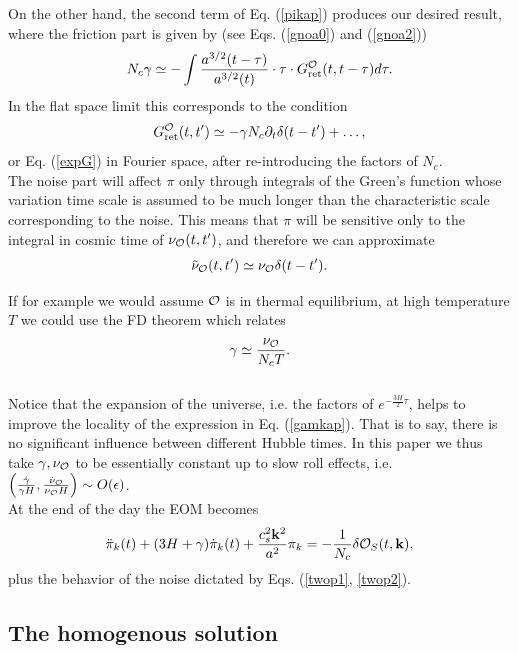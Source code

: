 \documentclass[11pt,amsmath,floats,floatfix,nofootinbib,secnumarabic, superscriptaddress, tightenlines]{revtex4}
\newcommand{\beq}{\begin{equation}}
\newcommand{\eeq}{\end{equation}}
\newcommand{\calo}{{\cal O}}
\begin{document}
{On the other hand, the second term of Eq. (\ref{pikap}) produces our desired result, where the friction part is given by (see Eqs. (\ref{gnoa0}) and (\ref{gnoa2}))
\beq
\label{gamkap}
N_c \gamma \simeq- \int \frac{a^{3/2}(t-\tau)}{a^{3/2}(t)}\cdot\tau\cdot G_{\rm ret}^\calo(t,t-\tau)d\tau.
\eeq
In the flat space limit this corresponds to the condition
\beq
\label{gretto}
G_{\rm ret}^\calo(t,t') \simeq -\gamma N_c \partial_t\delta(t-t')+\ldots,
\eeq
or Eq. (\ref{expG}) in Fourier space, after re-introducing the factors of $N_c$.\\

 The noise part  will affect $\pi$ only through integrals of the Green's function whose variation time scale is assumed to be much longer than the characteristic scale corresponding to the noise. This means that $\pi$ will be sensitive only to the integral in cosmic time of $\nu_{\calo}(t,t')$, and therefore we can approximate
\beq
\label{twop2}
\tilde \nu_{\calo}(t,t') \simeq \nu_{\calo} \delta(t-t').
\eeq

If for example we would assume $\calo$ is in thermal equilibrium, at high temperature $T$ we could use the FD theorem which relates \beq \label{fdthg}\gamma \simeq \frac{\nu_{\calo}}{N_c T}.\eeq\\

Notice that the expansion of the universe, i.e. the factors of $e^{-\frac{3H}{2}\tau}$, helps to improve the locality of the expression in Eq. (\ref{gamkap}). That is to say, there is no significant influence between different Hubble times. In this paper we thus take $\gamma, \nu_{\calo}$ to be essentially constant up to slow roll effects, i.e. $\left(\frac{\dot\gamma}{\gamma H},\frac{\dot\nu_{\calo}}{\nu_{\calo} H}\right) \sim O(\epsilon)$. \\

At the end of the day the EOM becomes
\beq
\label{fineom}
\ddot\pi_k(t) + (3H+\gamma) \dot\pi_k(t)+ \frac{c_s^2{\bf k}^2}{a^2} \pi_k = -\frac{1}{N_c} \delta\calo_S(t,{\bf k}),
\eeq
plus the behavior of the noise dictated by Eqs. (\ref{twop1}, \ref{twop2}).

\subsection{The homogenous solution}\label{homog}

}
\end{document}
